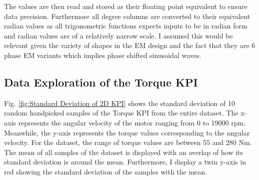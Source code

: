 \documentclass{report} %
\begin{document}
The values are then read and stored as their floating point equivalent to ensure data precision.
Furthermore all degree columns are converted to their equivalent radian values as all trigonometric functions expects inputs to be in radian form and radian values are of
a relatively narrow scale. 
I assumed this would be relevant given the variety of shapes in the \ac{EM} design and the fact that they are 6 phase \ac{EM} variants which implies phase shifted 
sinusoidal waves.

\subsection{Data Exploration of the Torque KPI}\label{subsec:Deep Dive into 2D KPI}
Fig. \ref{fig:Standard Deviation of 2D KPI} shows the standard deviation of 10 random handpicked samples of the Torque \ac{KPI} from the entire dataset.
The x-axis represents the angular velocity of the motor ranging from 0 to 19000 rpm. Meanwhile, the y-axis represents the torque values corresponding to the 
angular velocity. For the dataset, the range of torque values are between 55 and 280 Nm. 
The mean of all samples of the dataset is displayed with an overlap of how its standard deviation is around the mean.
Furthermore, I display a twin y-axis in red showing the standard deviation of the samples with the mean.\\
\end{document}
